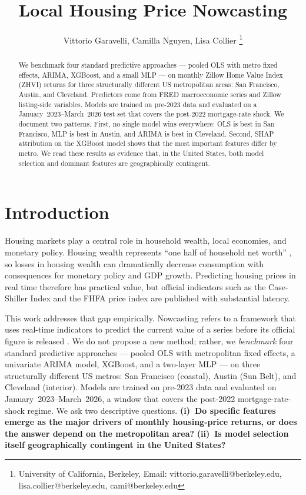 \documentclass[12pt]{article}
\title{Local Housing Price Nowcasting}
\author{Vittorio Garavelli, Camilla Nguyen, Lisa Collier \thanks{University of California, Berkeley, Email: vittorio.garavelli@berkeley.edu, lisa.collier@berkeley.edu, cami@berkeley.edu}}
\begin{document}
\maketitle
\vspace{-1.5cm}
\begin{abstract}
\noindent We benchmark four standard predictive approaches --- pooled OLS with metro fixed effects, ARIMA, XGBoost, and a small MLP --- on monthly Zillow Home Value Index (ZHVI) returns for three structurally different US metropolitan areas: San Francisco, Austin, and Cleveland. Predictors come from FRED macroeconomic series and Zillow listing-side variables. Models are trained on pre-2023 data and evaluated on a January~2023--March~2026 test set that covers the post-2022 mortgage-rate shock. We document two patterns. First, no single model wins everywhere: OLS is best in San Francisco, MLP is best in Austin, and ARIMA is best in Cleveland. Second, SHAP attribution on the XGBoost model shows that the most important features differ by metro. We read these results as evidence that, in the United States, both model selection and dominant features are geographically contingent.
\end{abstract}


\section{Introduction}

Housing markets play a central role in household wealth, local economies, and monetary policy. Housing wealth represents ``one half of household net worth'' \cite{iacoviello2011}, so losses in housing wealth can dramatically decrease consumption with consequences for monetary policy and GDP growth. Predicting housing prices in real time therefore has practical value, but official indicators such as the Case-Shiller Index and the FHFA price index are published with substantial latency.

This work addresses that gap empirically. Nowcasting refers to a framework that uses real-time indicators to predict the current value of a series before its official figure is released \cite{mcgough2020}. We do not propose a new method; rather, we \emph{benchmark} four standard predictive approaches --- pooled OLS with metropolitan fixed effects, a univariate ARIMA model, XGBoost, and a two-layer MLP --- on three structurally different US metros: San Francisco (coastal), Austin (Sun Belt), and Cleveland (interior). Models are trained on pre-2023 data and evaluated on January~2023--March~2026, a window that covers the post-2022 mortgage-rate-shock regime. We ask two descriptive questions. \textbf{(i)~Do specific features emerge as the major drivers of monthly housing-price returns, or does the answer depend on the metropolitan area?} \textbf{(ii)~Is model selection itself geographically contingent in the United States?}
\end{document}
